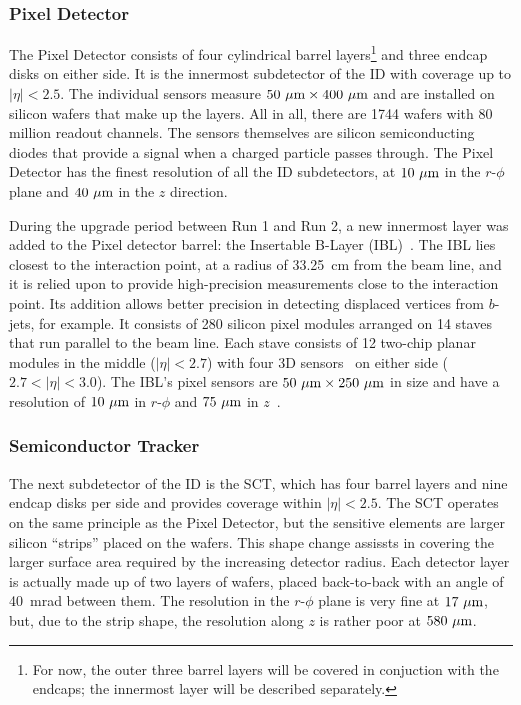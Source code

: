 \subsubsection{Pixel Detector} \label{sec:pixel}
The Pixel Detector consists of four cylindrical barrel layers\footnote{For now, the outer three barrel layers will be covered in conjuction with the endcaps; the innermost layer will be described separately.} and three endcap disks on either side.
It is the innermost subdetector of the ID with coverage up to $|\eta| < 2.5$.
The individual sensors measure $50~\mu\textrm{m}\times 400~\mu\textrm{m}$ and are installed on silicon wafers that make up the layers.
All in all, there are 1744 wafers with 80 million readout channels.
The sensors themselves are silicon semiconducting diodes that provide a signal when a charged particle passes through.
The Pixel Detector has the finest resolution of all the ID subdetectors, at $10~\mu\textrm{m}$ in the $r$-$\phi$ plane and $40~\mu\textrm{m}$ in the $z$ direction.

During the upgrade period between Run 1 and Run 2, a new innermost layer was added to the Pixel detector barrel: the Insertable B-Layer (IBL)~\cite{2010.ibl-tdr}.
The IBL lies closest to the interaction point, at a radius of 33.25~cm from the beam line, and it is relied upon to provide high-precision measurements close to the interaction point.
Its addition allows better precision in detecting displaced vertices from $b$-jets, for example.
It consists of 280 silicon pixel modules arranged on 14 staves that run parallel to the beam line.
Each stave consists of 12 two-chip planar modules in the middle ($|\eta| < 2.7$) with four 3D sensors~\cite{2015.ibl-3d} on either side ($2.7 < |\eta| < 3.0$).
The IBL's pixel sensors are $50~\mu\textrm{m}\times 250~\mu\textrm{m}$ in size and have a resolution of $10~\mu\textrm{m}$ in $r$-$\phi$ and $75~\mu\textrm{m}$ in $z$~\cite{2016.ibl-resolution}.

\subsubsection{Semiconductor Tracker} \label{sec:sct}
The next subdetector of the ID is the SCT, which has four barrel layers and nine endcap disks per side and provides coverage within $|\eta| < 2.5$.
The SCT operates on the same principle as the Pixel Detector, but the sensitive elements are larger silicon ``strips'' placed on the wafers.
This shape change assissts in covering the larger surface area required by the increasing detector radius.
Each detector layer is actually made up of two layers of wafers, placed back-to-back with an angle of 40~mrad between them.
The resolution in the $r$-$\phi$ plane is very fine at $17~\mu\textrm{m}$, but, due to the strip shape, the resolution along $z$ is rather poor at $580~\mu\textrm{m}$.

